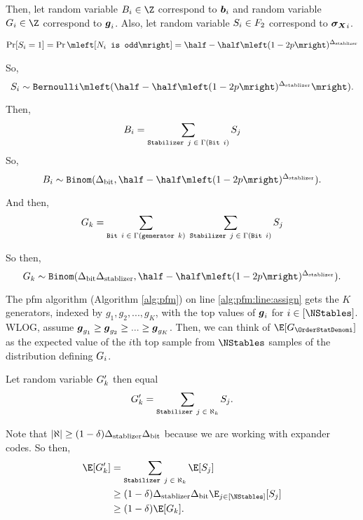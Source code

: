 Then, let random variable $\bitscoreRV_i \in \Z$ correspond to $\boldsymbol{b}_i$ and random variable $\generatorscoreRV_i \in \Z$
correspond to $\boldsymbol{g}_i$. Also, let random variable $S_i \in F_2$ correspond  to $\boldsymbol{\boldsymbol{\sigma_X}}_i$.

\newcommand{\SPr}{\half - \half\mleft(1-2p\mright)^\DegStable}
\begin{align*}
	\Pr[S_i = 1] = \Pr\mleft[\texttt{$N_i$ is odd}\mright] = \SPr
\end{align*}

So,
$$
	\syndromeRV_i \sim \texttt{Bernoulli}\mleft(\SPr\mright).
$$

Then,
$$
	B_i = \sum_{\texttt{Stabilizer $j$} \; \in \; \Gamma(\texttt{Bit $i$})} S_j
$$
So, 
$$
	\bitscoreRV_i \sim \texttt{Binom}(\DegBit, \SPr).
$$

And then,
$$
	G_k =
		\sum_{\texttt{Bit $i$} \; \in \; \Gamma(\texttt{generator } k)}\;
			\sum_{\texttt{Stabilizer } j \; \in \; \Gamma(\texttt{Bit } i)}
				S_j
$$

So then,
$$
	\generatorscoreRV_k \sim \texttt{Binom}(\DegBit \DegStable, \SPr).
$$

The pfm algorithm (Algorithm \ref{alg:pfm}) on line \ref{alg:pfm:line:assign}
gets the $K$ generators, indexed by $g_1, g_2, ..., g_K$, with the top values
of $\boldsymbol{g}_i$ for $i \in [\NStables]$. WLOG, assume
$\boldsymbol{g}_{g_1} \geq \boldsymbol{g}_{g_2} \geq ... \geq \boldsymbol{g}_{g_K}$.
Then, we can think of $\E[\generatorscoreRV_{\OrderStatDenomi}]$ as the expected value of the $i$th
top sample from $\NStables$ samples of the distribution defining $G_i$.

Let random variable $G'_k$ then equal
$$
	G'_k =
		\sum_{\texttt{Stabilizer $j$} \; \in \; \aleph_k} S_j.
$$

Note that $|\aleph| \geq (1 - \delta) {\Delta_{\text{stablizer}}} {\Delta_{\text{bit}}}$ because we are working with expander codes.
So then, \begin{align*}
	\E[\genscoreRVCorrected_k] &= 
		\sum_{\texttt{Stabilizer $j$} \; \in \; \aleph_k} \E[\syndromeRV_j] \\
		&\geq (1 - \delta) \DegStable \DegBit \E_{j \in [\NStables]}[\syndromeRV_j]\\
		&\geq (1 - \delta) \E[\generatorscoreRV_k].
\end{align*}


